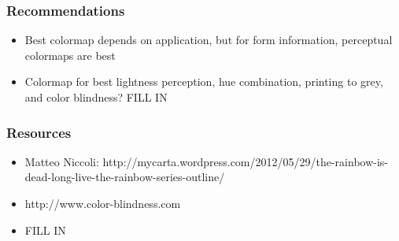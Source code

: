 \documentclass[ignorenonframetext]{beamer}
\begin{document}
\begin{frame}[t]\frametitle{Recommendations}
\begin{itemize}
    \item Best colormap depends on application, but for form information, perceptual colormaps are best
    \item Colormap for best lightness perception, hue combination, printing to grey, and color blindness? FILL IN
\end{itemize}
\end{frame}

\begin{frame}[t]\frametitle{Resources}
\begin{itemize}
    \item Matteo Niccoli: http://mycarta.wordpress.com/2012/05/29/the-rainbow-is-dead-long-live-the-rainbow-series-outline/
    \item http://www.color-blindness.com
    \item FILL IN
\end{itemize}
\end{frame}
\end{document}
